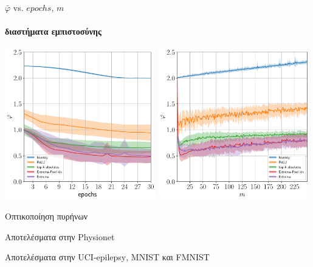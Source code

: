 \documentclass{beamer}
\begin{document}
\begin{frame}[c]{$\bar\varphi$ \textlatin{vs}. $epochs$, $m$}
	\framesubtitle{διαστήματα εμπιστοσύνης}
	\includegraphics[width=0.49\textwidth]{"images_1d/mean_flethos_validation_epochs"}
	\includegraphics[width=0.49\textwidth]{"images_1d/mean_flethos_variable_kernel_size_list"}
\end{frame}

\begin{frame}[c]{Οπτικοποίηση πυρήνων}
	
\end{frame}

\begin{frame}[c]{Αποτελέσματα στην \textlatin{Physionet}}
	\begin{table}
		\begin{center}
			\scalebox{0.44}{
				\textlatin{
					
					}}
		\end{center}
	\end{table}
\end{frame}

\begin{frame}[c]{Αποτελέσματα στην \textlatin{UCI-epilepsy}, \textlatin{MNIST} και \textlatin{FMNIST}}
	\begin{table}
		\scalebox{0.44}{
			\textlatin{
				
				}}
	\end{table}
	\begin{table}
		\scalebox{0.44}{
			\textlatin{
				
				}}
	\end{table}
	\begin{table}
		\scalebox{0.44}{
			\textlatin{
				
				}}
	\end{table}
\end{frame}
\end{document}
